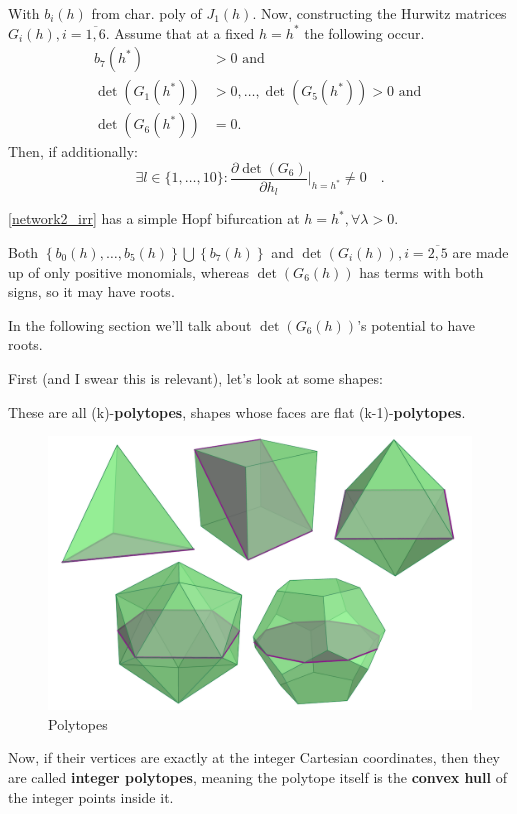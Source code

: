 With $b_i(h)$ from char. poly of $J_1(h)$.
Now, constructing the Hurwitz matrices $G_i(h), i = \overline{1,6}$. Assume that at a fixed $h = h^*$ the following occur.
\begin{equation}\label{bifurcation_main_condition}
	\begin{aligned}
		b_{7}(h^{*})&>0 \text{ and } \\
		\det(G_1(h^*))&>0,\ldots,\det(G_5(h^*))>0 \text{ and }\\
		\det(G_6(h^*))&=0.
	\end{aligned}
\end{equation}
Then, if additionally:
\begin{equation}\label{bifurcation_transversality_condition}
	\exists l\in\{1,\ldots,10\} : \frac{\partial\det(G_6)}{\partial h_l}|_{h=h^*}\neq0\quad.
\end{equation}

\ref{network2_irr} has a simple Hopf bifurcation at $h = h^*, \forall \lambda > 0$.

Both $\left\{ b_0(h), \ldots, b_5(h) \right\} \bigcup \left\{   b_7(h) \right\}$ and
$\det(G_i(h)), i = \overline{2,5}$ are made up of only positive monomials, whereas $\det(G_6(h))$ has terms with both signs, so it may have roots.

In the following section we'll talk about $\det(G_6(h))$'s potential to have roots.

First (and I swear this is relevant), let's look at some shapes:

These are all (k)-\textbf{polytopes}, shapes whose faces are flat (k-1)-\textbf{polytopes}.
\begin{figure}[H]
	\centering
	\includegraphics[width=13cm]{math_pics/polytopes.png}
	\caption{Polytopes \cite{Brandenburg2024}}
\end{figure}
Now, if their vertices are exactly at the integer Cartesian coordinates, then they are called \textbf{integer polytopes}, meaning the polytope itself is the \textbf{convex hull} of the integer points inside it.

